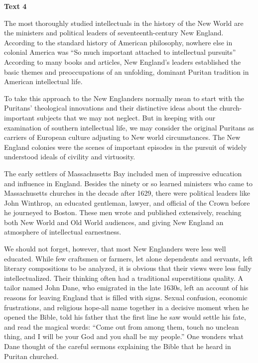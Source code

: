 
\begin{center}\textbf{Text 4}\end{center}

\qquad The most thoroughly studied intellectuals in the history of the New World are the ministers and political leaders of seventeenth-century New England. According to the standard history of American philosophy, nowhere else in colonial America was ``So much important attached to intellectual pursuits'' According to many books and articles, New England's leaders established the basic themes and preoccupations of an unfolding, dominant Puritan tradition in American intellectual life.

\qquad To take this approach to the New Englanders normally mean to start with the Puritans' theological innovations and their distinctive ideas about the church-important subjects that we may not neglect. But in keeping with our examination of southern intellectual life, we may consider the original Puritans as carriers of European culture adjusting to New world circumstances. The New England colonies were the scenes of important episodes in the pursuit of widely understood ideals of civility and virtuosity.

\qquad The early settlers of Massachusetts Bay included men of impressive education and influence in England. Besides the ninety or so learned ministers who came to Massachusetts churches in the decade after 1629, there were political leaders like John Winthrop, an educated gentleman, lawyer, and official of the Crown before he journeyed to Boston. These men wrote and published extensively, reaching both New World and Old World audiences, and giving New England an atmosphere of intellectual earnestness.

\qquad We should not forget, however, that most New Englanders were less well educated. While few craftsmen or farmers, let alone dependents and servants, left literary compositions to be analyzed, it is obvious that their views were less fully intellectualized. Their thinking often had a traditional superstitions quality. A tailor named John Dane, who emigrated in the late 1630s, left an account of his reasons for leaving England that is filled with signs. Sexual confusion, economic frustrations, and religious hope-all name together in a decisive moment when he opened the Bible, told his father that the first line he saw would settle his fate, and read the magical words: ``Come out from among them, touch no unclean thing, and I will be your God and you shall be my people.'' One wonders what Dane thought of the careful sermons explaining the Bible that he heard in Puritan churched.


